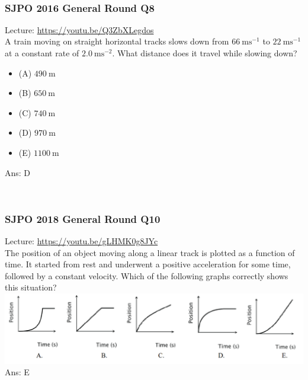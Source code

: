 \documentclass{article}
\begin{document}
\\[20pt]
\begin{samepage}
\subsubsection{SJPO 2016 General Round Q8}
Lecture: \url{https://youtu.be/Q3ZbXLegdos} \\[10pt]
A train moving on straight horizontal tracks slows down from $66 \mathrm{~ms}^{-1}$ to $22 \mathrm{~ms}^{-1}$ at a constant rate of $2.0 \mathrm{~ms}^{-2}$. What distance does it travel while slowing down?
\begin{itemize}
\item[](A) $490 \mathrm{~m}$
\item[](B) $650 \mathrm{~m}$
\item[](C) $740 \mathrm{~m}$
\item[](D) $970 \mathrm{~m}$ 
\item[](E) $1100 \mathrm{~m}$ \end{itemize}
Ans: \ifpaper D \fi
\end{samepage}
\\[20pt]
\begin{samepage}
\subsubsection{SJPO 2018 General Round Q10} 
Lecture: \url{https://youtu.be/gLHMK0g8JYc} \\[10pt]
The position of an object moving along a linear track is plotted as a function of time. It started from rest and underwent a positive acceleration for some time, followed by a constant velocity. Which of the following graphs correctly shows this situation?\\
\includegraphics[width=\linewidth]{2018q10.png}\\
Ans: \ifpaper E \fi\\
\end{samepage}
\end{document}
